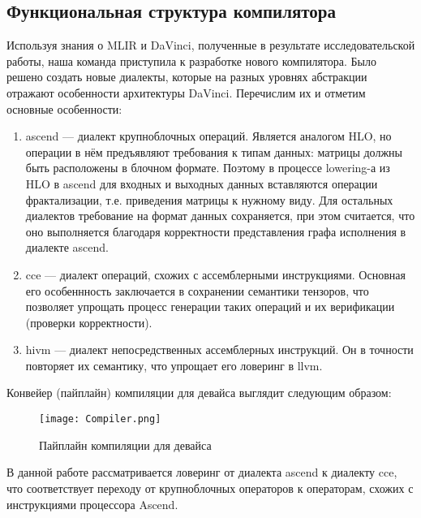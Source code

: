 \subsection{Функциональная структура компилятора}
\label{impl:compiler} %

Используя знания о MLIR и DaVinci, полученные в результате исследовательской
работы, наша команда приступила к разработке нового компилятора. Было решено
создать новые диалекты, которые на разных уровнях абстракции отражают
особенности архитектуры DaVinci. Перечислим их и отметим основные особенности:

\begin{enumerate}
    \item ascend --- диалект крупноблочных операций. Является аналогом HLO, но
          операции в нём предъявляют требования к типам данных: матрицы должны
          быть расположены в блочном формате. Поэтому в процессе lowering-а
          из HLO в ascend для входных и выходных данных вставляются операции
          фрактализации, т.е. приведения матрицы к нужному виду. Для остальных
          диалектов требование на формат данных сохраняется, при этом считается,
          что оно выполняется благодаря корректности представления графа
          исполнения в диалекте ascend.

    \item cce --- диалект операций, схожих с ассемблерными инструкциями.
          Основная его особеннность заключается в сохранении семантики
          тензоров, что позволяет упрощать процесс генерации таких операций и
          их верификации (проверки корректности).

    \item hivm --- диалект непосредственных ассемблерных инструкций. Он в
          точности повторяет их семантику, что упрощает его ловеринг в llvm.
\end{enumerate}

Конвейер (пайплайн) компиляции для девайса выглядит следующим образом:

\begin{figure}[h!]
      \centering
      \texttt{[image: Compiler.png]}
      \caption{Пайплайн компиляции для девайса}
  \end{figure}

В данной работе рассматривается ловеринг от диалекта ascend к диалекту cce,
что соответствует переходу от крупноблочных операторов к операторам, схожих с
инструкциями процессора Ascend.
